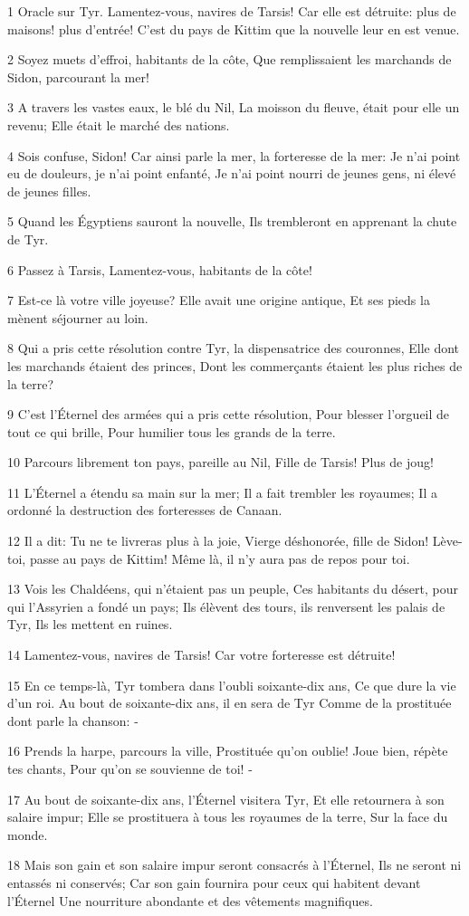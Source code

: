\par 1 Oracle sur Tyr. Lamentez-vous, navires de Tarsis! Car elle est détruite: plus de maisons! plus d'entrée! C'est du pays de Kittim que la nouvelle leur en est venue.
\par 2 Soyez muets d'effroi, habitants de la côte, Que remplissaient les marchands de Sidon, parcourant la mer!
\par 3 A travers les vastes eaux, le blé du Nil, La moisson du fleuve, était pour elle un revenu; Elle était le marché des nations.
\par 4 Sois confuse, Sidon! Car ainsi parle la mer, la forteresse de la mer: Je n'ai point eu de douleurs, je n'ai point enfanté, Je n'ai point nourri de jeunes gens, ni élevé de jeunes filles.
\par 5 Quand les Égyptiens sauront la nouvelle, Ils trembleront en apprenant la chute de Tyr.
\par 6 Passez à Tarsis, Lamentez-vous, habitants de la côte!
\par 7 Est-ce là votre ville joyeuse? Elle avait une origine antique, Et ses pieds la mènent séjourner au loin.
\par 8 Qui a pris cette résolution contre Tyr, la dispensatrice des couronnes, Elle dont les marchands étaient des princes, Dont les commerçants étaient les plus riches de la terre?
\par 9 C'est l'Éternel des armées qui a pris cette résolution, Pour blesser l'orgueil de tout ce qui brille, Pour humilier tous les grands de la terre.
\par 10 Parcours librement ton pays, pareille au Nil, Fille de Tarsis! Plus de joug!
\par 11 L'Éternel a étendu sa main sur la mer; Il a fait trembler les royaumes; Il a ordonné la destruction des forteresses de Canaan.
\par 12 Il a dit: Tu ne te livreras plus à la joie, Vierge déshonorée, fille de Sidon! Lève-toi, passe au pays de Kittim! Même là, il n'y aura pas de repos pour toi.
\par 13 Vois les Chaldéens, qui n'étaient pas un peuple, Ces habitants du désert, pour qui l'Assyrien a fondé un pays; Ils élèvent des tours, ils renversent les palais de Tyr, Ils les mettent en ruines.
\par 14 Lamentez-vous, navires de Tarsis! Car votre forteresse est détruite!
\par 15 En ce temps-là, Tyr tombera dans l'oubli soixante-dix ans, Ce que dure la vie d'un roi. Au bout de soixante-dix ans, il en sera de Tyr Comme de la prostituée dont parle la chanson: -
\par 16 Prends la harpe, parcours la ville, Prostituée qu'on oublie! Joue bien, répète tes chants, Pour qu'on se souvienne de toi! -
\par 17 Au bout de soixante-dix ans, l'Éternel visitera Tyr, Et elle retournera à son salaire impur; Elle se prostituera à tous les royaumes de la terre, Sur la face du monde.
\par 18 Mais son gain et son salaire impur seront consacrés à l'Éternel, Ils ne seront ni entassés ni conservés; Car son gain fournira pour ceux qui habitent devant l'Éternel Une nourriture abondante et des vêtements magnifiques.

